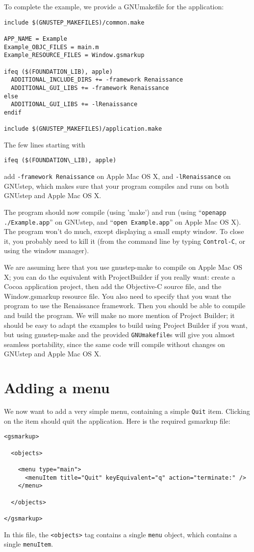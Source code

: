 \documentclass[a4paper]{article}
\begin{document}
To complete the example, we provide a GNUmakefile for the application:
\begin{verbatim}
include $(GNUSTEP_MAKEFILES)/common.make

APP_NAME = Example
Example_OBJC_FILES = main.m
Example_RESOURCE_FILES = Window.gsmarkup

ifeq ($(FOUNDATION_LIB), apple)
  ADDITIONAL_INCLUDE_DIRS += -framework Renaissance
  ADDITIONAL_GUI_LIBS += -framework Renaissance
else
  ADDITIONAL_GUI_LIBS += -lRenaissance
endif

include $(GNUSTEP_MAKEFILES)/application.make
\end{verbatim}
The few lines starting with 
\begin{verbatim}
ifeq ($(FOUNDATION\_LIB), apple)
\end{verbatim}
add \texttt{-framework Renaissance} on Apple Mac OS X, and
\texttt{-lRenaissance} on GNUstep, which makes sure that your program
compiles and runs on both GNUstep and Apple Mac OS X.

The program should now compile (using 'make') and run (using
``\texttt{openapp ./Example.app}'' on GNUstep, and ``\texttt{open
  Example.app}'' on Apple Mac OS X).  The program won't do much,
except displaying a small empty window.  To close it, you probably
need to kill it (from the command line by typing \texttt{Control-C},
or using the window manager).

We are assuming here that you use gnustep-make to compile on Apple Mac
OS X; you can do the equivalent with ProjectBuilder if you really
want: create a Cocoa application project, then add the Objective-C
source file, and the Window.gsmarkup resource file.  You also need to
specify that you want the program to use the Renaissance framework.
Then you should be able to compile and build the program.  We will
make no more mention of Project Builder; it should be easy to adapt
the examples to build using Project Builder if you want, but using
gnustep-make and the provided \texttt{GNUmakefile}s will give you
almost seamless portability, since the same code will compile without
changes on GNUstep and Apple Mac OS X.

\section{Adding a menu}
We now want to add a very simple menu, containing a simple
\texttt{Quit} item.  Clicking on the item should quit the application.
Here is the required gsmarkup file:
\begin{verbatim}
<gsmarkup>

  <objects>

    <menu type="main">
      <menuItem title="Quit" keyEquivalent="q" action="terminate:" />
    </menu>
 
  </objects>

</gsmarkup>
\end{verbatim}
In this file, the \texttt{<objects>} tag contains a single
\texttt{menu} object, which contains a single \texttt{menuItem}.
\end{document}
